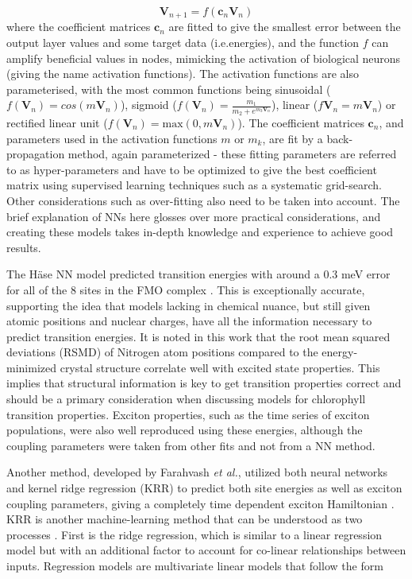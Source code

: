\begin{equation}
	\mathbf{V}_{n+1} = f(\mathbf{c}_n \mathbf{V}_n)
\end{equation}
%
where the coefficient matrices $\mathbf{c}_n$ are fitted to give the smallest error
between the output layer values and some target data (i.e.\Qy energies), and the
function $f$ can amplify beneficial values in nodes, mimicking the activation of
biological neurons (giving the name activation functions). The activation functions  
are also parameterised, with the most common functions being sinusoidal ($f(\mathbf{V}_n)=cos(m \mathbf{V}_n)$), 
sigmoid ($f(\mathbf{V}_n)=\frac{m_1}{m_2 + e^{m_3 \mathbf{V}_n}}$), linear 
($f{\mathbf{V}}_{n}=m \mathbf{V}_{n}$) or rectified linear unit ($f(\mathbf{V}_{n})=\text{max}\left(0, m \mathbf{V}_{n} \right)$). 
The coefficient matrices $\mathbf{c}_n$, and parameters used in the activation functions
$m$ or $m_k$, are fit by a back-propagation method, again parameterized - these fitting
parameters are referred to as hyper-parameters and have to be optimized to give 
the best coefficient matrix using supervised learning techniques such as a systematic
grid-search. Other considerations such as over-fitting also need to be taken into account.
The brief explanation of NNs here glosses over more practical considerations, and
creating these models takes in-depth knowledge and experience to achieve good results.

The H\"{a}se NN model predicted \Qy transition energies with around a 0.3 meV error
for all of the 8 sites in the FMO complex \cite{AspuruGuzik2016}. This is exceptionally
accurate, supporting the idea that models lacking in chemical nuance, but still 
given atomic positions and nuclear charges, have all the information necessary to
predict transition energies. It is noted in this work that the root mean squared 
deviations (RSMD) of Nitrogen atom positions compared to the energy-minimized crystal 
structure correlate well with excited state properties. This implies that structural
information is key to get transition properties correct and should be a primary 
consideration when discussing models for chlorophyll transition properties. Exciton
properties, such as the time series of exciton populations, were also well reproduced
using these \Qy energies, although the coupling parameters were taken from other
fits and not from a NN method.

Another method, developed by Farahvash \emph{et al.}, utilized both neural networks
and kernel ridge regression (KRR) to predict both site energies as well as exciton 
coupling parameters, giving a completely time dependent exciton Hamiltonian \cite{Farahvash2020}. 
KRR is another machine-learning method that can be understood as two processes \cite{Hastie2009}. 
First is the ridge regression, which is similar to a linear regression model but 
with an additional factor to account for co-linear relationships between inputs.
Regression models are multivariate linear models that follow the form

